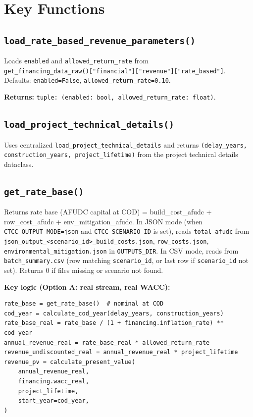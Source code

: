 \documentclass[ctcc_full_documentation.tex]{subfiles}
\begin{document}
\section{Key Functions}

\subsection{\texttt{load\_rate\_based\_revenue\_parameters()}}

Loads \texttt{enabled} and \texttt{allowed\_return\_rate} from\\
\texttt{get\_financing\_data\_raw()["financial"]["revenue"]["rate\_based"]}.\\
Defaults: \texttt{enabled=False}, \texttt{allowed\_return\_rate=0.10}.

\textbf{Returns:} \texttt{tuple: (enabled: bool, allowed\_return\_rate: float)}.

\subsection{\texttt{load\_project\_technical\_details()}}

Uses centralized \texttt{load\_project\_technical\_details} and returns \texttt{(delay\_years, construction\_years, project\_lifetime)} from the project technical details dataclass.

\subsection{\texttt{get\_rate\_base()}}

Returns rate base (AFUDC capital at COD) = build\_cost\_afudc + row\_cost\_afudc + env\_mitigation\_afudc. In JSON mode (when \texttt{CTCC\_OUTPUT\_MODE=json} and \texttt{CTCC\_SCENARIO\_ID} is set), reads \texttt{total\_afudc} from \texttt{json\_output\_<scenario\_id>\_build\_costs.json}, \texttt{row\_costs.json}, \texttt{environmental\_mitigation.json} in \texttt{OUTPUTS\_DIR}. In CSV mode, reads from \texttt{batch\_summary.csv} (row matching \texttt{scenario\_id}, or last row if \texttt{scenario\_id} not set). Returns 0 if files missing or scenario not found.

\textbf{Key logic (Option A: real stream, real WACC):}
\begin{lstlisting}
rate_base = get_rate_base()  # nominal at COD
cod_year = calculate_cod_year(delay_years, construction_years)
rate_base_real = rate_base / (1 + financing.inflation_rate) ** cod_year
annual_revenue_real = rate_base_real * allowed_return_rate
revenue_undiscounted_real = annual_revenue_real * project_lifetime
revenue_pv = calculate_present_value(
    annual_revenue_real,
    financing.wacc_real,
    project_lifetime,
    start_year=cod_year,
)
\end{lstlisting}
\end{document}
